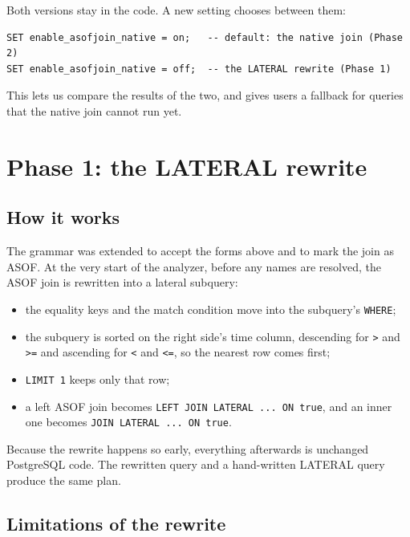\documentclass[11pt,a4paper]{article}
\newcommand{\code}[1]{\texttt{#1}}
\begin{document}
Both versions stay in the code. A new setting chooses between them:

\begin{lstlisting}
SET enable_asofjoin_native = on;   -- default: the native join (Phase 2)
SET enable_asofjoin_native = off;  -- the LATERAL rewrite (Phase 1)
\end{lstlisting}

This lets us compare the results of the two, and gives users a fallback for
queries that the native join cannot run yet.

\section{Phase 1: the LATERAL rewrite}

\subsection{How it works}

The grammar was extended to accept the forms above and to mark the join as ASOF. At
the very start of the analyzer, before any names are resolved, the ASOF join is rewritten
into a lateral subquery:

\begin{itemize}
  \item the equality keys and the match condition move into the subquery's \code{WHERE};
  \item the subquery is sorted on the right side's time column, descending for \code{>}
        and \code{>=} and ascending for \code{<} and \code{<=}, so the nearest row comes
        first;
  \item \code{LIMIT 1} keeps only that row;
  \item a left ASOF join becomes \code{LEFT JOIN LATERAL ... ON true}, and an inner one
        becomes \code{JOIN LATERAL ... ON true}.
\end{itemize}

Because the rewrite happens so early, everything afterwards is unchanged PostgreSQL code.
The rewritten query and a hand-written LATERAL query produce the same plan.

\subsection{Limitations of the rewrite}
\end{document}

